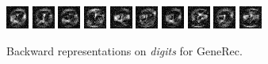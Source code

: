 \begin{figure}[H]
  \centering
  \includegraphics{../presentation/img/dig_0.png} 
  \includegraphics{../presentation/img/dig_1.png} 
  \includegraphics{../presentation/img/dig_2.png} 
  \includegraphics{../presentation/img/dig_3.png} 
  \includegraphics{../presentation/img/dig_4.png} 
  \includegraphics{../presentation/img/dig_5.png} 
  \includegraphics{../presentation/img/dig_6.png} 
  \includegraphics{../presentation/img/dig_7.png} 
  \includegraphics{../presentation/img/dig_8.png} 
  \includegraphics{../presentation/img/dig_9.png} 
  \caption{Backward representations on \emph{digits} for GeneRec.}
  \label{fig:results-backward-repre-generec}
\end{figure}
